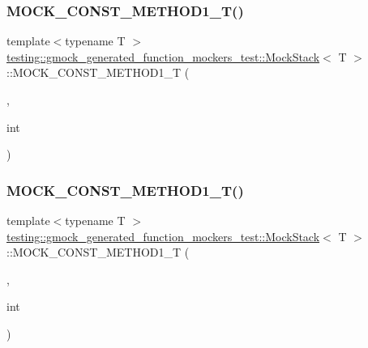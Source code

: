 \subsubsection{\texorpdfstring{MOCK\_CONST\_METHOD1\_T()}{MOCK\_CONST\_METHOD1\_T()}\hspace{0.1cm}{\footnotesize\ttfamily [1/3]}}
{\footnotesize\ttfamily template$<$typename T $>$ \\
\mbox{\hyperlink{classtesting_1_1gmock__generated__function__mockers__test_1_1_mock_stack}{testing\+::gmock\+\_\+generated\+\_\+function\+\_\+mockers\+\_\+test\+::\+Mock\+Stack}}$<$ T $>$\+::M\+O\+C\+K\+\_\+\+C\+O\+N\+S\+T\+\_\+\+M\+E\+T\+H\+O\+D1\+\_\+T (\begin{DoxyParamCaption}\item[{Return\+Type\+With\+Comma}]{,  }\item[{std\+::map$<$ int, int $>$}]{int }\end{DoxyParamCaption})}

\mbox{\label{classtesting_1_1gmock__generated__function__mockers__test_1_1_mock_stack_a69b9a7d0231b729d8a47201a49fa9166}} 
\subsubsection{\texorpdfstring{MOCK\_CONST\_METHOD1\_T()}{MOCK\_CONST\_METHOD1\_T()}\hspace{0.1cm}{\footnotesize\ttfamily [2/3]}}
{\footnotesize\ttfamily template$<$typename T $>$ \\
\mbox{\hyperlink{classtesting_1_1gmock__generated__function__mockers__test_1_1_mock_stack}{testing\+::gmock\+\_\+generated\+\_\+function\+\_\+mockers\+\_\+test\+::\+Mock\+Stack}}$<$ T $>$\+::M\+O\+C\+K\+\_\+\+C\+O\+N\+S\+T\+\_\+\+M\+E\+T\+H\+O\+D1\+\_\+T (\begin{DoxyParamCaption}\item[{Return\+Type\+With\+Comma}]{,  }\item[{std\+::map$<$ int, int $>$}]{int }\end{DoxyParamCaption})}

